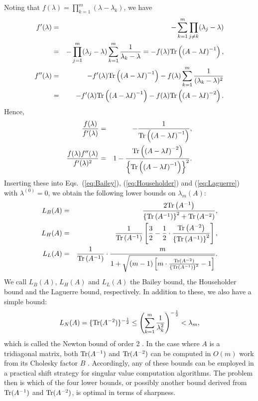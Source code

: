 \documentclass{amsart}
\begin{document}
Noting that $f(\lambda)=\prod_{k=1}^m(\lambda-\lambda_k)$, we have
\begin{eqnarray}
f'(\lambda) &=& -\sum_{k=1}^m \prod_{j\ne k}(\lambda_j-\lambda) \nonumber \\
&=& -\prod_{j=1}^m(\lambda_j-\lambda)\sum_{k=1}^m\frac{1}{\lambda_k-\lambda} = -f(\lambda){\rm Tr}\left(\left(A-\lambda I\right)^{-1}\right), \\
f''(\lambda) &=& -f'(\lambda){\rm Tr}\left(\left(A-\lambda I\right)^{-1}\right)-f(\lambda)\sum_{k=1}^m\frac{1}{(\lambda_k-\lambda)^2} \nonumber \\
&=& -f'(\lambda){\rm Tr}\left(\left(A-\lambda I\right)^{-1}\right)-f(\lambda){\rm Tr}\left(\left(A-\lambda I\right)^{-2}\right).
\end{eqnarray}
Hence,
\begin{eqnarray}
\frac{f(\lambda)}{f'(\lambda)} &=& -\frac{1}{{\rm Tr}\left(\left(A-\lambda I\right)^{-1}\right)}, \\
\frac{f(\lambda)f''(\lambda)}{f'(\lambda)^2} &=& 1-\frac{{\rm Tr}\left(\left(A-\lambda I\right)^{-2}\right)}{\left\{{\rm Tr}\left(\left(A-\lambda I\right)^{-1}\right)\right\}^2}.
\end{eqnarray}
Inserting these into Eqs.~(\ref{eq:Bailey}), (\ref{eq:Householder}) and (\ref{eq:Laguerre}) with $\lambda^{(0)}=0$, we obtain the following lower bounds on $\lambda_m(A)$:
\begin{eqnarray}
L_B(A) &=& \frac{2 {\rm Tr}\left(A^{-1}\right)}{\left\{{\rm Tr}\left(A^{-1}\right)\right\}^2+{\rm Tr}\left(A^{-2}\right)}, \\
L_H(A) &=& \frac{1}{{\rm Tr}\left(A^{-1}\right)}\left[\frac{3}{2}-\frac{1}{2}\cdot\frac{{\rm Tr}\left(A^{-2}\right)}{\left\{{\rm Tr}\left(A^{-1}\right)\right\}^2}\right], \\
L_L(A) &=& \frac{1}{{\rm Tr}\left(A^{-1}\right)}\cdot\frac{m}{1+\sqrt{(m-1)\left[m\cdot\frac{{\rm Tr}\left(A^{-2}\right)}{\left\{{\rm Tr}\left(A^{-1}\right)\right\}^2}-1\right]}}. \label{eq:Laguerre3}
\end{eqnarray}
We call $L_B(A)$, $L_H(A)$ and $L_L(A)$ the Bailey bound, the Householder bound and the Laguerre bound, respectively. In addition to these, we also have a simple bound:
\begin{equation}
L_N(A) = \{{\rm Tr}(A^{-2})\}^{-\frac{1}{2}} \le \left(\sum_{k=1}^m\frac{1}{\lambda_k^2}\right)^{-\frac{1}{2}} < \lambda_m,
\end{equation}
which is called the Newton bound of order 2 \cite{Matt97, Kimura11, Aishima10}. In the case where $A$ is a tridiagonal matrix, both ${\rm Tr}(A^{-1})$ and ${\rm Tr}(A^{-2})$ can be computed in $O(m)$ work from its Cholesky factor $B$ \cite{Kimura11, Yamashita12, Yamashita15}. Accordingly, any of these bounds can be employed in a practical shift strategy for singular value computation algorithms. The problem then is which of the four lower bounds, or possibly another bound derived from ${\rm Tr}(A^{-1})$ and ${\rm Tr}(A^{-2})$, is optimal in terms of sharpness.
\end{document}
